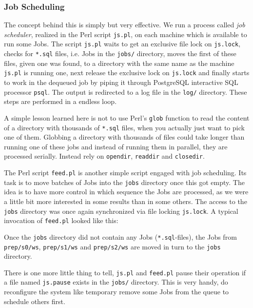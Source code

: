 \subsubsection{Job Scheduling}
\label{sec:jobscheduling}
The concept behind this
is simply but very effective.  We run a process called \emph{job
scheduler}, realized in the Perl script \texttt{js.pl}, on each
machine which is available to run some Jobs. The script \texttt{js.pl}
waits to get an exclusive file lock on \texttt{js.lock}, checks for
\texttt{*.sql} files, i.e. Jobs in the \texttt{jobs/} directory, moves
the first of these files, given one was found, to a directory with the
same name as the machine \texttt{js.pl} is running one, next release
the exclusive lock on \texttt{js.lock} and finally starts to work in
the dequeued job by piping it through PostgreSQL interactive SQL
processor \texttt{psql}. The output is redirected to a log file in the
\texttt{log/} directory.  These steps are performed in a endless loop.

A simple lesson learned here is not to use Perl's \texttt{glob}
function to read the content of a directory with thousands of
\texttt{*.sql} files, when you actually just want to pick one of
them. Globbing a directory with thousands of files could take longer
than running one of these jobs and instead of running them in
parallel, they are processed serially.  Instead rely on \texttt{opendir},
\texttt{readdir} and \texttt{closedir}.

The Perl script \texttt{feed.pl} is another simple script engaged with
job scheduling.  Its task is to move batches of Jobs into the
\texttt{jobs} directory once this got empty.  The idea is to have
more control in which sequence the Jobs are processed, as we were a
little bit more interested in some results than in some others.  The
access to the \texttt{jobs} directory was once again synchronized via
file locking \texttt{js.lock}.  A typical invocation of
\texttt{feed.pl} looked like this:

\begin{interactive}
\end{interactive}

Once the \texttt{jobs} directory did not contain any Jobs
(\texttt{*.sql}-files), the Jobs from \texttt{prep/s0/ws},
\texttt{prep/s1/ws} and \texttt{prep/s2/ws} are moved in turn to the
\texttt{jobs} directory.

There is one more little thing to tell, \texttt{js.pl} and
\texttt{feed.pl} pause their operation if a file named \texttt{js.pause} exists
in the \texttt{jobs/} directory.  This is very handy, do reconfigure
the system like temporary remove some Jobs from the queue to schedule
others first.


